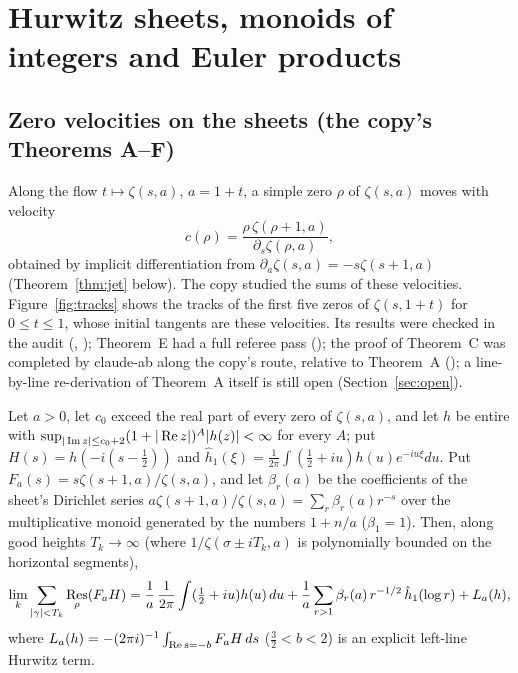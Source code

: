 \section{Hurwitz sheets, monoids of integers and Euler products}\label{sec:sheets}

\subsection{Zero velocities on the sheets (the copy's Theorems A--F)}

Along the flow $t\mapsto\zeta(s,a)$, $a=1+t$, a simple zero $\rho$ of $\zeta(s,a)$ moves with velocity
\[
c(\rho)=\frac{\rho\,\zeta(\rho+1,a)}{\partial_s\zeta(\rho,a)},
\]
obtained by implicit differentiation from $\partial_a\zeta(s,a)=-s\zeta(s+1,a)$ (Theorem~\ref{thm:jet} below).
The copy studied the sums of these velocities. Figure~\ref{fig:tracks} shows the tracks of the first five zeros of $\zeta(s,1+t)$ for $0\le t\le1$, whose initial tangents are these velocities.
Its results were checked in the audit (, ); Theorem~E had a full referee pass (); the proof of Theorem~C was completed by claude-ab along the copy's route, relative to Theorem~A (); a line-by-line re-derivation of Theorem~A itself is still open (Section~\ref{sec:open}).

\begin{theorem}\label{thm:A}
Let $a>0$, let $c_0$ exceed the real part of every zero of $\zeta(s,a)$, and let $h$ be entire with $\sup_{|\operatorname{Im} z|\le c_0+2}(1+|\operatorname{Re} z|)^A|h(z)|<\infty$ for every $A$; put $H(s)=h(-i(s-\tfrac12))$ and $\hat h_1(\xi)=\frac1{2\pi}\int(\tfrac12+iu)h(u)e^{-iu\xi}du$.
Put $F_a(s)=s\zeta(s+1,a)/\zeta(s,a)$, and let $\beta_r(a)$ be the coefficients of the sheet's Dirichlet series $a\zeta(s+1,a)/\zeta(s,a)=\sum_{r}\beta_r(a)r^{-s}$ over the multiplicative monoid generated by the numbers $1+n/a$ ($\beta_1=1$).
Then, along good heights $T_k\to\infty$ (where $1/\zeta(\sigma\pm iT_k,a)$ is polynomially bounded on the horizontal segments),
\[
\lim_k\sum_{|\gamma|<T_k}\operatorname*{Res}_\rho(F_aH)=\frac1a\,\frac1{2\pi}\int(\tfrac12+iu)h(u)\,du+\frac1a\sum_{r>1}\beta_r(a)\,r^{-1/2}\,\hat h_1(\log r)+L_a(h),
\]
where $L_a(h)=-(2\pi i)^{-1}\int_{\operatorname{Re} s=-b}F_aH\,ds$ ($\tfrac32<b<2$) is an explicit left-line Hurwitz term.
\end{theorem}

